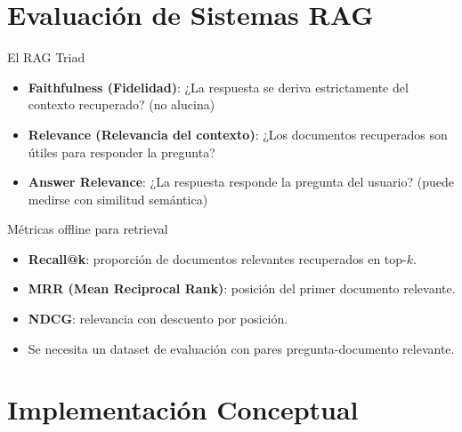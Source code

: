 \documentclass[aspectratio=169, 10pt, xcolor=table]{beamer}
\begin{document}
\section{Evaluaci\'on de Sistemas RAG}

\begin{frame}{El RAG Triad}
    \begin{itemize}
        \item \textbf{Faithfulness (Fidelidad)}: ¿La respuesta se deriva estrictamente del contexto recuperado? (no alucina)
        \item \textbf{Relevance (Relevancia del contexto)}: ¿Los documentos recuperados son \'utiles para responder la pregunta?
        \item \textbf{Answer Relevance}: ¿La respuesta responde la pregunta del usuario? (puede medirse con similitud sem\'antica)
    \end{itemize}
\end{frame}

\begin{frame}{M\'etricas offline para retrieval}
    \begin{itemize}
        \item \textbf{Recall@k}: proporci\'on de documentos relevantes recuperados en top-$k$.
        \item \textbf{MRR (Mean Reciprocal Rank)}: posici\'on del primer documento relevante.
        \item \textbf{NDCG}: relevancia con descuento por posici\'on.
        \item Se necesita un dataset de evaluaci\'on con pares pregunta-documento relevante.
    \end{itemize}
\end{frame}

\section{Implementaci\'on Conceptual}
\end{document}
